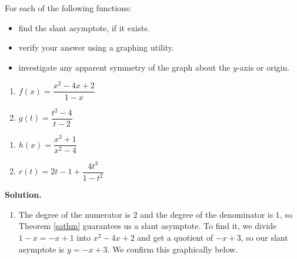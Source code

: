 \documentclass{ximera}
\begin{document}
\begin{example} \label{saexample}  For each of the following functions:

\begin{itemize}

\item find the slant asymptote, if it exists.

\item  verify your answer using a graphing utility.

\item  investigate any apparent symmetry of the graph about the $y$-axis or origin.

\end{itemize}


\begin{enumerate}

\item  $f(x) = \dfrac{x^2-4x+2}{1-x}$  

\item  \label{sacancel} $g(t) = \dfrac{t^2-4}{t-2}$

\setcounter{HW}{\value{enumi}}
\end{enumerate}

\begin{enumerate}
\setcounter{enumi}{\value{HW}}


\item  $h(x) = \dfrac{x^3+1}{x^2-4}$

\item  $r(t) = 2t-1+\dfrac{4t^3}{1-t^2}$ 

\setcounter{HW}{\value{enumi}}
\end{enumerate}



{\bf Solution.}

\begin{enumerate}

\item  The degree of the numerator is $2$ and the degree of the denominator is $1$, so Theorem \ref{sathm} guarantees us a slant asymptote.  To find it, we divide $1-x = -x+1$ into $x^2-4x+2$ and get a quotient of $-x+3$, so our slant asymptote is $y=-x+3$.  We confirm this graphically below.
\begin{center}
\end{center} 


\end{enumerate}
\end{example}
\end{document}
